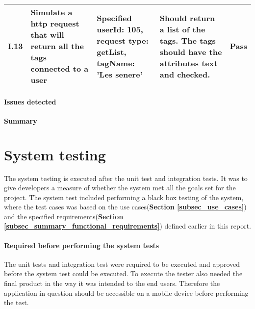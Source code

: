 {\begin{center}
\begin{longtable}{ | p{1cm} | p{5.5cm} | p{4cm} | p{4.5cm} | p{2cm}|}
					
			I.13 & Simulate a http request that will return all the tags connected to a user  & Specified userId: 105, \newline request type: getList, \newline tagName: 'Les senere' & Should return a list of the tags. The tags should have the attributes text and checked. & Pass\\ \hline	

\end{longtable}
\end{center}

\paragraph{Issues detected}

\paragraph{Summary}


\section{System testing}

The system testing is executed after the unit test and integration tests. It was to give developers a measure of whether the system met all the goals set for the project.  The system test included performing a black box testing of the system, where the test cases was based on the use cases(\textbf{Section \ref{subsec_use_cases}}) and the specified requirements(\textbf{Section \ref{subsec_summary_functional_requirements}})  defined earlier in this report. \newline

\paragraph{Required before performing the system tests}
The unit tests and integration test were required to be executed and approved before the system test could be executed. To execute the tester also needed the final product in the way it was intended to the end users. Therefore the application in question should be accessible on a mobile device before performing the test. \newline

}
